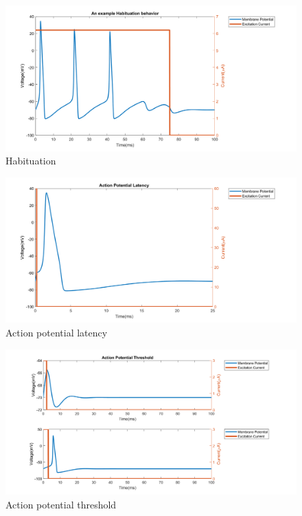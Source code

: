\documentclass{IEEEtran}
\begin{document}
\begin{figure}[h]
\centering
\includegraphics[width=\textwidth]{Fig3.png}
\caption{Habituation}\label{fig:habit}
\end{figure} 
\begin{figure}[h]
\centering
\includegraphics[width=\textwidth]{Fig7.png}
\caption{Action potential latency}\label{fig:apl}
\end{figure}
\clearpage
\begin{figure}[h]
    \centering
    \includegraphics[width=\textwidth]{Fig8.png}
    \caption{Action potential threshold}\label{fig:apth}
    \end{figure}
\newpage
\end{document}
